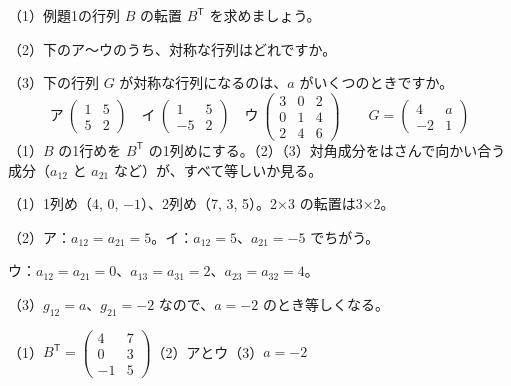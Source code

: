 \begin{reidai}[転置と対称な行列]
（1）例題1の行列 $B$ の転置 $B^{\mathsf T}$ を求めましょう。\par
（2）下のア〜ウのうち、対称な行列はどれですか。\par
（3）下の行列 $G$ が対称な行列になるのは、$a$ がいくつのときですか。
\[ \text{ア}\ \begin{pmatrix} 1 & 5\\ 5 & 2 \end{pmatrix}\quad \text{イ}\ \begin{pmatrix} 1 & 5\\ -5 & 2 \end{pmatrix}\quad \text{ウ}\ \begin{pmatrix} 3 & 0 & 2\\ 0 & 1 & 4\\ 2 & 4 & 6 \end{pmatrix}\qquad G=\begin{pmatrix} 4 & a\\ -2 & 1 \end{pmatrix} \]
\kangaekata （1）$B$ の1行めを $B^{\mathsf T}$ の1列めにする。（2）（3）対角成分をはさんで向かい合う成分（$a_{12}$ と $a_{21}$ など）が、すべて等しいか見る。\par
\shiki\kviibs{}\zw{} （1）1列め（4, 0, $-1$）、2列め（7, 3, 5）。2×3 の転置は3×2。\par
\kviiba （2）ア：$a_{12}=a_{21}=5$。イ：$a_{12}=5$、$a_{21}=-5$ でちがう。\par
\kviiba \phantom{（2）}ウ：$a_{12}=a_{21}=0$、$a_{13}=a_{31}=2$、$a_{23}=a_{32}=4$。\par
\kviiba （3）$g_{12}=a$、$g_{21}=-2$ なので、$a=-2$ のとき等しくなる。\par
\kotae\kviibs{}\zw{} （1）$\displaystyle B^{\mathsf T}=\begin{pmatrix} 4 & 7\\ 0 & 3\\ -1 & 5 \end{pmatrix}$\qquad （2）アとウ\qquad （3）$a=-2$
\end{reidai}


